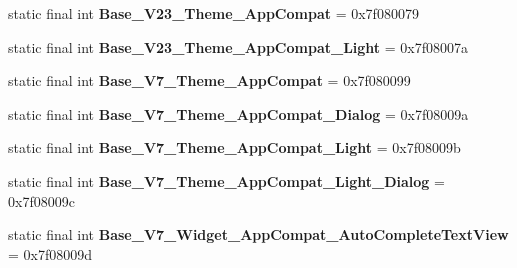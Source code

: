 \begin{DoxyCompactItemize}
\item 
\hypertarget{classandroid_1_1support_1_1design_1_1_r_1_1style_a51ae26e7db14e3694ad3a1407c77696c}{}static final int {\bfseries Base\+\_\+\+V23\+\_\+\+Theme\+\_\+\+App\+Compat} = 0x7f080079\label{classandroid_1_1support_1_1design_1_1_r_1_1style_a51ae26e7db14e3694ad3a1407c77696c}

\item 
\hypertarget{classandroid_1_1support_1_1design_1_1_r_1_1style_a590015dcac5ee7ee1c7f82e7db386a8f}{}static final int {\bfseries Base\+\_\+\+V23\+\_\+\+Theme\+\_\+\+App\+Compat\+\_\+\+Light} = 0x7f08007a\label{classandroid_1_1support_1_1design_1_1_r_1_1style_a590015dcac5ee7ee1c7f82e7db386a8f}

\item 
\hypertarget{classandroid_1_1support_1_1design_1_1_r_1_1style_ac307f81dfe0e14e01c0963d9cd722432}{}static final int {\bfseries Base\+\_\+\+V7\+\_\+\+Theme\+\_\+\+App\+Compat} = 0x7f080099\label{classandroid_1_1support_1_1design_1_1_r_1_1style_ac307f81dfe0e14e01c0963d9cd722432}

\item 
\hypertarget{classandroid_1_1support_1_1design_1_1_r_1_1style_a31a92314ed1ac7dbe3564f1d79411770}{}static final int {\bfseries Base\+\_\+\+V7\+\_\+\+Theme\+\_\+\+App\+Compat\+\_\+\+Dialog} = 0x7f08009a\label{classandroid_1_1support_1_1design_1_1_r_1_1style_a31a92314ed1ac7dbe3564f1d79411770}

\item 
\hypertarget{classandroid_1_1support_1_1design_1_1_r_1_1style_abe04237f3a2ce7821478da9f45a9dff7}{}static final int {\bfseries Base\+\_\+\+V7\+\_\+\+Theme\+\_\+\+App\+Compat\+\_\+\+Light} = 0x7f08009b\label{classandroid_1_1support_1_1design_1_1_r_1_1style_abe04237f3a2ce7821478da9f45a9dff7}

\item 
\hypertarget{classandroid_1_1support_1_1design_1_1_r_1_1style_a991ccb5eb4946b399bde90052ef1e6e3}{}static final int {\bfseries Base\+\_\+\+V7\+\_\+\+Theme\+\_\+\+App\+Compat\+\_\+\+Light\+\_\+\+Dialog} = 0x7f08009c\label{classandroid_1_1support_1_1design_1_1_r_1_1style_a991ccb5eb4946b399bde90052ef1e6e3}

\item 
\hypertarget{classandroid_1_1support_1_1design_1_1_r_1_1style_ad851a8db0e50a006775dd76e7efa50fe}{}static final int {\bfseries Base\+\_\+\+V7\+\_\+\+Widget\+\_\+\+App\+Compat\+\_\+\+Auto\+Complete\+Text\+View} = 0x7f08009d\label{classandroid_1_1support_1_1design_1_1_r_1_1style_ad851a8db0e50a006775dd76e7efa50fe}


\end{DoxyCompactItemize}
